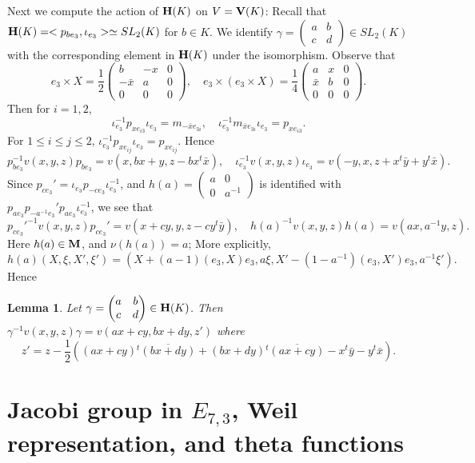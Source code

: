 \documentclass[11pt]{amsart}
\numberwithin{equation}{section}
\newtheorem{lemma}[theorem]{Lemma}
\theoremstyle{definition}
\begin{document}
Next we compute the action of $\bold H(K)$ on $V=\bold V(K)$: Recall that $\bold H(K)=<p_{be_3}, \iota_{e_3}>\simeq SL_2(K)$ for $b\in K$.
We identify $\gamma=\begin{pmatrix} a&b\\c&d\end{pmatrix}\in SL_2(K)$ with the corresponding element in $\bold H(K)$ under the isomorphism. 
Observe \cite{F} that 
$$e_3\times X=\frac 12 \begin{pmatrix} b&-x&0\\ -\bar x&a&0\\ 0&0&0\end{pmatrix},\quad
e_3\times (e_3\times X)=\frac 14 \begin{pmatrix} a&x&0\\ \bar x&b&0\\ 0&0&0\end{pmatrix}.
$$
Then for $i=1,2$,
\begin{equation}\label{iota}
\iota_{e_3}^{-1}p_{x e_{i3}} \iota_{e_3}=m_{-\bar x e_{3i}},\quad
\iota_{e_3}^{-1}m_{\bar x e_{3i}}\iota_{e_3}=p_{x e_{i3}}.
\end{equation}
For $1\leq i\leq j\leq 2$, $\iota_{e_3}^{-1}p_{x e_{ij}} \iota_{e_3}=p_{x e_{ij}}$.
Hence 
$$p_{be_3}^{-1} v(x,y,z) {p_{be_3}}=v(x,bx+y, z-b x {}^t {\bar x}),\quad \iota_{e_3}^{-1} v(x,y,z) \iota_{e_3}=v(-y,x,z+x {}^t \bar y+y {}^t\bar x).
$$
Since $p_{ce_3}'=\iota_{e_3} p_{-ce_3}\iota_{e_3}^{-1}$, and
$h(a)=\begin{pmatrix} a&0\\0&a^{-1}\end{pmatrix}$ is identified with $p_{ae_3}p_{-a^{-1}e_3}'p_{ae_3} \iota_{e_3}^{-1}$,
we see that
$${p_{ce_3}'}^{-1} v(x,y,z) {p_{ce_3}'}=v(x+cy,y, z-c y {}^t {\bar y}),\quad h(a)^{-1}v(x,y,z)h(a)=v(ax,a^{-1}y,z).
$$
Here $h(a)\in \bold M$, and $\nu(h(a))=a$; More explicitly,
$$h(a)(X,\xi,X',\xi')=(X+(a-1)(e_3,X)e_3, a\xi, X'-(1-a^{-1})(e_3,X')e_3, a^{-1}\xi').
$$
Hence 
\begin{lemma} \label{H}
Let $\gamma=\begin{pmatrix} a&b\\c&d\end{pmatrix}\in \bold H(K)$. Then 
$\gamma^{-1} v(x,y,z) \gamma=v(ax+cy, bx+dy,z')$
where $$z'=z-\frac 12( (ax+cy){}^t\overline{(bx+dy)}+ (bx+dy){}^t\overline{(ax+cy)}-x {}^t\bar y-y {}^t\bar x).$$
\end{lemma}

\section{Jacobi group in $E_{7,3}$, Weil representation, and theta functions}
\end{document}
